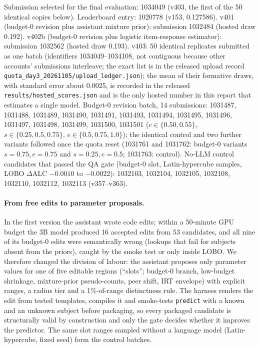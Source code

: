 \documentclass{article}
\begin{document}
Submission selected for the final evaluation: 1034049 (v403, the first of the 50 identical copies below). Leaderboard entry: 1020778 (v153, 0.127586). v401 (budget-0 revision plus assistant mixture prior): submission 1032484 (hosted draw 0.192). v402b (budget-0 revision plus logistic item-response estimator): submission 1032562 (hosted draw 0.193). v403: 50 identical replicates submitted as one batch (identifiers 1034049--1034108, not contiguous because other accounts' submissions interleave; the exact list is in the released upload record \texttt{quota\_day3\_20261105/upload\_ledger.json}); the mean of their formative draws, with standard error about 0.0025, is recorded in the released \texttt{results/hosted\_scores.json} and is the only hosted number in this report that estimates a single model. Budget-0 revision batch, 14 submissions: 1031487, 1031488, 1031489, 1031490, 1031491, 1031493, 1031494, 1031495, 1031496, 1031497, 1031498, 1031499, 1031500, 1031501 ($c\in\{0.50,0.55\}$, $s\in\{0.25,0.5,0.75\}$, $e\in\{0.5,0.75,1.0\}$); the identical control and two further variants followed once the quota reset (1031761 and 1031762: budget-0 variants $s{=}0.75,e{=}0.75$ and $s{=}0.25,e{=}0.5$; 1031763: control). No-LLM control candidates that passed the QA gate (budget-0 slot, Latin-hypercube samples, LOBO $\Delta$ALC $-0.0010$ to $-0.0022$): 1032103, 1032104, 1032105, 1032108, 1032110, 1032112, 1032113 (v357--v363). \paragraph{From free edits to parameter proposals.} In the first version the assistant wrote code edits; within a 50-minute GPU budget the 3B model produced 16 accepted edits from 53 candidates, and all nine of its budget-0 edits were semantically wrong (lookups that fail for subjects absent from the priors), caught by the smoke test or only inside LOBO. We therefore changed the division of labour: the assistant proposes only parameter values for one of five editable regions (``slots''; budget-0 branch, low-budget shrinkage, mixture-prior pseudo-counts, peer shift, IRT envelope) with explicit ranges, a radius tier and a 1\%-of-range distinctness rule. The harness renders the edit from tested templates, compiles it and smoke-tests \texttt{predict} with a known and an unknown subject before packaging, so every packaged candidate is structurally valid by construction and only the gate decides whether it improves the predictor. The same slot ranges sampled without a language model (Latin-hypercube, fixed seed) form the control batches.
\end{document}
